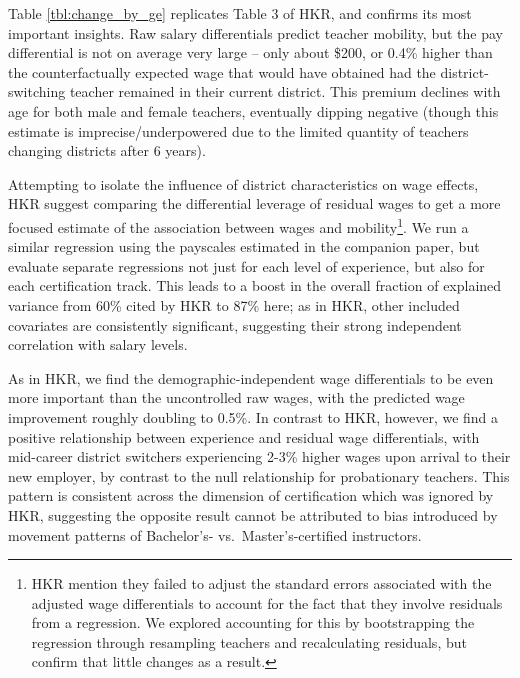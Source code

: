 \documentclass[12pt,]{article}
\let\rmarkdownfootnote\footnote%
\def\footnote{\protect\rmarkdownfootnote}
\begin{document}
Table \ref{tbl:change_by_ge} replicates Table 3 of HKR, and confirms its
most important insights. Raw salary differentials predict teacher
mobility, but the pay differential is not on average very large -- only
about \$200, or 0.4\% higher than the counterfactually expected wage
that would have obtained had the district-switching teacher remained in
their current district. This premium declines with age for both male and
female teachers, eventually dipping negative (though this estimate is
imprecise/underpowered due to the limited quantity of teachers changing
districts after 6 years).

Attempting to isolate the influence of district characteristics on wage
effects, HKR suggest comparing the differential leverage of residual
wages to get a more focused estimate of the association between wages
and mobility\footnote{HKR mention they failed to adjust the standard
  errors associated with the adjusted wage differentials to account for
  the fact that they involve residuals from a regression. We explored
  accounting for this by bootstrapping the regression through resampling
  teachers and recalculating residuals, but confirm that little changes
  as a result.}. We run a similar regression using the payscales
estimated in the companion paper, but evaluate separate regressions not
just for each level of experience, but also for each certification
track. This leads to a boost in the overall fraction of explained
variance from 60\% cited by HKR to 87\% here; as in HKR, other included
covariates are consistently significant, suggesting their strong
independent correlation with salary levels.

As in HKR, we find the demographic-independent wage differentials to be
even more important than the uncontrolled raw wages, with the predicted
wage improvement roughly doubling to 0.5\%. In contrast to HKR, however,
we find a positive relationship between experience and residual wage
differentials, with mid-career district switchers experiencing 2-3\%
higher wages upon arrival to their new employer, by contrast to the null
relationship for probationary teachers. This pattern is consistent
across the dimension of certification which was ignored by HKR,
suggesting the opposite result cannot be attributed to bias introduced
by movement patterns of Bachelor's- vs.~Master's-certified instructors.
\end{document}
